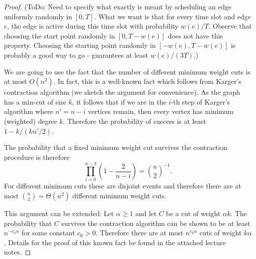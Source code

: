 \documentclass[runningheads]{llncs}
\numberwithin{equation}{section}
\begin{document}
\begin{proof}
(ToDo: Need to specify what exactly is meant by scheduling an edge uniformly randomly in $[0,T]$. What we want is that for every time slot and edge $e$, the edge is active during this time slot with probability $w(e)/T$. Observe that choosing the start point randomly in $[0, T-w(e)]$ does not have this property. Choosing the starting point randomly in $[-w(e), T-w(e)]$ is probably a good way to go - guarantees at least $w(e)/(3T)$.)

We are going to use the fact that the number of different minimum weight cuts is at most $O(n^2)$. In fact, this  is a well-known fact which follows from Karger's contraction algorithm (we sketch the argument for convenience).
As the graph has a min-cut of size $k$, it follows that if we are in the $i$-th step of Karger's algorithm where $n' = n-i$ vertices remain, then every vertex has minimum (weighted) degree $k$. Therefore the probability of success is at least $1 - k/(kn'/2)$.

The probability that a fixed minimum weight cut survives the contraction procedure is therefore
\[\prod_{i=0}^{n-3} (1 - \frac{2}{n-i}) = {n \choose 2}^{-1}.
\]
For different minimum cuts these are disjoint events and therefore there are at most ${n \choose 2} = \Theta(n^2)$ different minimum weight cuts.

This argument can be extended: Let $\alpha \geq 1$ and let $C$ be a cut of weight $\alpha k$. The probability that $C$ survives the contraction algorithm can be shown to be at least $n^{-c_0\alpha}$ for some constant $c_0 > 0$. Therefore there are at most $n^{c_0\alpha}$ cuts of weight $k\alpha$. Details for the proof of this known fact be found in the attached lecture notes.


\end{proof}
\end{document}
